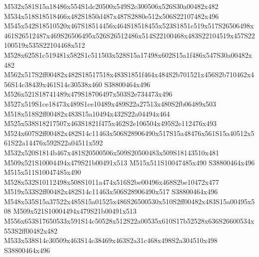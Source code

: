 \documentclass{article}
\begin{document}
\begin{multicols}{2}







M532x581S15a18486x554S1dc20500x549S2c300506x526S30a00482x482 M534x518S18518466x482S1850d487x487S2880e512x506S22107482x496 M545x542S18510520x467S18514456x464S18518455x523S1851c519x517S26506498x461S26512487x469S26506495x526S26512486x514S22100468x483S22104519x457S22100519x535S22104468x512 M528x625S1c519481x582S1c511503x528S15a17498x602S15a1f486x547S30a00482x482 M562x517S2ff00482x482S18517518x483S1851f464x484S2b701521x456S2b710462x456S14c38439x461S14c30538x460 S38800464x496 M526x521S18741489x479S18706497x503S2e734473x496 M527x519S1ce18473x489S1ce10489x489S22a27513x480S2fb06489x503 M518x518S2ff00482x483S15a10494x432S22a04494x464 M525x538S18217507x463S1821f475x462S2e106504x495S2e112476x493 M524x607S2ff00482x482S14c11463x506S28906490x517S15a48476x561S15a40512x561S22a14476x592S22a04511x592 M532x520S1814b467x481S20500506x509S20500483x509S18143510x481 M509x521S10004494x479S21b00491x513 M515x511S10047485x490 S38800464x496 M515x511S10047485x490 M528x532S10112498x508S1011a474x516S2be00496x468S2be10472x477 M519x533S2ff00482x482S14c11463x506S28906490x517 S38800464x496 M548x535S15a37522x485S15a01525x486S26500530x510S2ff00482x483S15a00495x508 M509x521S10004494x479S21b00491x513 M556x653S17650533x591S14c50528x512S22a00535x610S17b52528x636S26600534x553S2ff00482x482 M533x538S14c30509x463S14c38469x463S2a31c468x498S2a304510x498 S38800464x496


\end{multicols}
\end{document}
